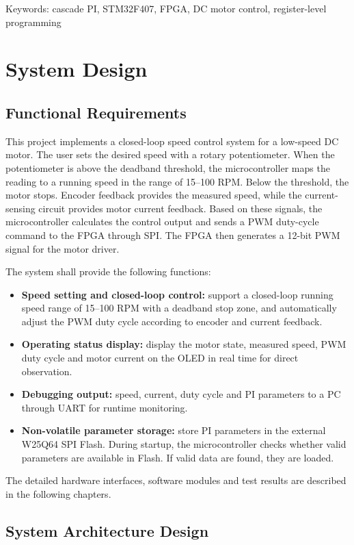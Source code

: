 \documentclass[12pt, a4paper]{report}
\begin{document}
Keywords: cascade PI, STM32F407, FPGA, DC motor control, register-level programming
\clearpage
\tableofcontents
\clearpage



\chapter{System Design}


\section{Functional Requirements}

This project implements a closed-loop speed control system for a low-speed DC motor. The user sets the desired speed with a rotary potentiometer. When the potentiometer is above the deadband threshold, the microcontroller maps the reading to a running speed in the range of 15--100 RPM. Below the threshold, the motor stops. Encoder feedback provides the measured speed, while the current-sensing circuit provides motor current feedback. Based on these signals, the microcontroller calculates the control output and sends a PWM duty-cycle command to the FPGA through SPI. The FPGA then generates a 12-bit PWM signal for the motor driver.

The system shall provide the following functions:
\begin{itemize}
    \item \textbf{Speed setting and closed-loop control:} support a closed-loop running speed range of 15--100 RPM with a deadband stop zone, and automatically adjust the PWM duty cycle according to encoder and current feedback.
    \item \textbf{Operating status display:} display the motor state, measured speed, PWM duty cycle and motor current on the OLED in real time for direct observation.
    \item \textbf{Debugging output:} speed, current, duty cycle and PI parameters to a PC through UART for runtime monitoring.
    \item \textbf{Non-volatile parameter storage:} store PI parameters in the external W25Q64 SPI Flash. During startup, the microcontroller checks whether valid parameters are available in Flash. If valid data are found, they are loaded.
\end{itemize}
The detailed hardware interfaces, software modules and test results are described in the following chapters.


\section{System Architecture Design}
\end{document}
